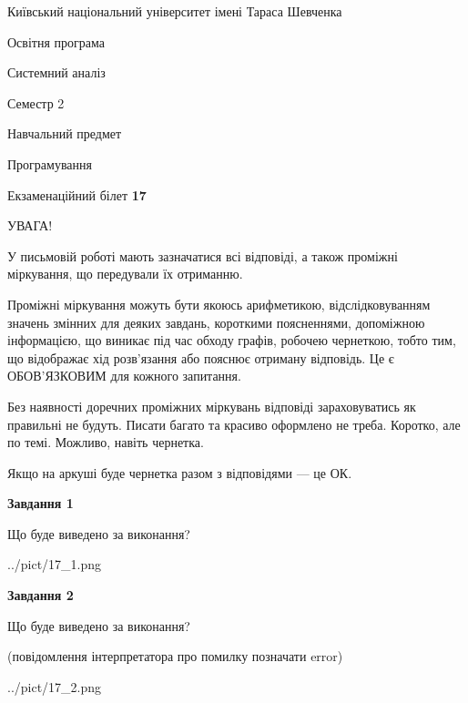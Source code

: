 \documentclass[12pt, ukrainian]{article}
\begin{document}
{{\begin {small}\par
{ \center  Київський національний університет імені Тараса Шевченка \par}
{\parbox {5 cm}{Освітня програма \hfill}{\parbox {7 cm}{Системний аналіз \hfill}}\parbox {6 cm}{\hfill Семестр 2}}\par
{\parbox {5 cm} {Навчальний предмет \hfill}\parbox {7 cm}{Програмування \hfill}\parbox {6cm}{\hfill}\par}\vspace{-7pt} \end{small}}{\center Екзаменаційний білет \No \textbf
{ 17 }\par}}
{
\begin {large}
УВАГА!

У письмовій роботі мають зазначатися всі відповіді, а також проміжні міркування, що передували їх отриманню.

Проміжні міркування можуть бути якоюсь арифметикою, відслідковуванням зна\-чень змінних для деяких завдань,
короткими поясненнями, допоміжною інформацією, що виникає під час обходу графів, робочею чернеткою,
тобто тим, що відображає хід розв’язання або пояснює отриману відповідь.
Це є ОБОВ’ЯЗКОВИМ для кожного запитання.

Без наявності доречних проміжних міркувань відповіді зараховуватись як правиль\-ні не будуть.
Писати багато та красиво оформлено не треба. Коротко, але по темі. Можли\-во, навіть чернетка.

Якщо на аркуші буде чернетка разом з відповідями --- це ОК.

\newpage

{\begin {center}\textbf{Завдання 1}\end {center}}\par
Що буде виведено за виконання?\par
\begin{center}
	{../pict/17_1.png}
\end{center}
\newpage

{\begin {center}\textbf{Завдання 2}\end {center}}\par
Що буде виведено за виконання?\par
 (повідомлення інтерпретатора про помилку позначати error)\par
\begin{center}
	{../pict/17_2.png}
\end{center}
\newpage


\end{large}}
\end{document}
